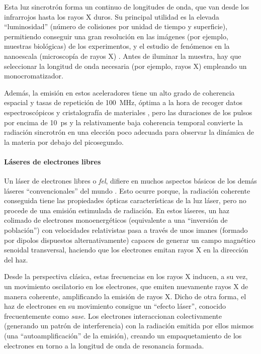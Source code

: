 Esta luz sincrotrón forma un continuo de longitudes de onda, que van desde los infrarrojos hasta los rayos X duros. Su principal utilidad es la elevada \enquote{luminosidad} (número de colisiones por unidad de tiempo y superficie), permitiendo conseguir una gran resolución en las imágenes (por ejemplo, muestras biológicas) de los experimentos, y el estudio de fenómenos en la nanoescala (microscopía de rayos X) \autocite{Rose2020}. Antes de iluminar la muestra, hay que seleccionar la longitud de onda necesaria (por ejemplo, rayos X) empleando un monocromatizador. 

Además, la emisión en estos aceleradores tiene un alto grado de coherencia espacial y tasas de repetición de \qty{100}{MHz}, óptima a la hora de recoger datos espectroscópicos y cristalografía de materiales \autocite{Li2022,Sanchez-Martin2023}, pero las duraciones de los pulsos por encima de \qty{10}{ps} y la relativamente baja coherencia temporal convierte la radiación sincrotrón en una elección poco adecuada para observar la dinámica de la materia por debajo del picosegundo. 

\paragraph{Láseres de electrones libres}
Un láser de electrones libres o \emph{\acrfull{fel}}, difiere en muchos aspectos básicos de los demás láseres \enquote{convencionales} del mundo \autocite{Thorne2017}. Esto ocurre porque, la radiación coherente conseguida tiene las propiedades ópticas características de la luz láser, pero no procede de una emisión estimulada de radiación. En estos láseres, un haz colimado de electrones monoenergéticos (equivalente a una \enquote{inversión de población}) con velocidades relativistas pasa a través de unos imanes (formado por dipolos dispuestos alternativamente) capaces de generar un campo magnético senoidal transversal, haciendo que los electrones emitan rayos X en la dirección del haz.

Desde la perspectiva clásica, estas frecuencias en los rayos X inducen, a su vez, un movimiento oscilatorio en los electrones, que emiten nuevamente rayos X de manera coherente, amplificando la emisión de rayos X. Dicho de otra forma, el haz de electrones en su movimiento consigue un \enquote{efecto láser}, conocido frecuentemente como \emph{\acrfull{sase}}. Los electrones interaccionan colectivamente (generando un patrón de interferencia) con la radiación emitida por ellos mismos (una \enquote{autoamplificación} de la emisión), creando un empaquetamiento de los electrones en torno a la longitud de onda de resonancia formada. 

